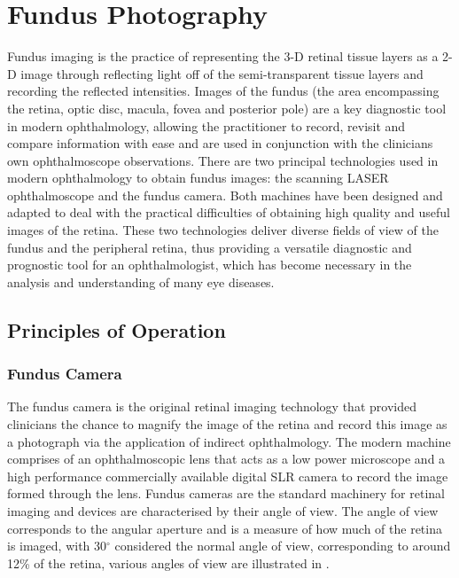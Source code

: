 
\chapter{Fundus Photography}
\label{fundus_photography}


Fundus imaging is the practice of representing the 3-D retinal
tissue layers as a 2-D image through reflecting light off of
the semi-transparent tissue layers and recording the reflected
intensities. Images of the fundus (the area encompassing the
retina, optic disc, macula, fovea and posterior pole) are a key
diagnostic tool in modern ophthalmology, allowing the practitioner
to record, revisit and compare information with ease and are used
in conjunction with the clinicians own ophthalmoscope observations.
There are two principal technologies used in modern ophthalmology
to obtain fundus images: the scanning LASER ophthalmoscope and the
fundus camera. Both machines have been designed and adapted to deal
with the practical difficulties of obtaining high quality and useful
images of the retina. These two technologies deliver diverse fields
of view of the fundus and the peripheral retina, thus providing a
versatile diagnostic and prognostic tool for an ophthalmologist,
which has become necessary in the analysis and understanding of
many eye diseases.\cite{spaide2005medical}


\section{Principles of Operation}

\subsection{Fundus Camera}

The fundus camera is the original retinal imaging technology that
provided clinicians the chance to magnify the image of the retina
and record this image as a photograph via the application of indirect
ophthalmology. The modern machine comprises of an ophthalmoscopic lens
that acts as a low power microscope and a high performance commercially
available digital SLR camera to record the image formed through the
lens.\cite{shibata2003fundus} Fundus cameras are the standard machinery
for retinal imaging and devices are characterised by their angle of
view. The angle of view corresponds to the angular aperture and is a
measure of how much of the retina is imaged, with 30$^\circ$ considered
the normal angle of view, corresponding to around 12\% of the retina,
various angles of view are illustrated in .

